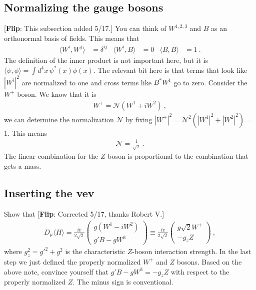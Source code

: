 \documentclass[12pt]{article}
\numberwithin{equation}{section}    %
\newcommand{\flip}[1]{{\color{red} [\textbf{Flip}: {#1}]}}
\begin{document}
\subsection*{Normalizing the gauge bosons}
\flip{This subsection added 5/17.}
You can think of $W^{1,2,3}$ and $B$ as an orthonormal basis of fields. This means that
\begin{align}
	\langle W^i, W^j\rangle &= \delta^{ij}
	&
	\langle W^i, B\rangle &= 0
	&
	\langle B, B\rangle &= 1 \ .
\end{align}
The definition of the inner product is not important here, but it is $\langle \psi, \phi\rangle = \int d^4x\, \psi^*(x)\phi(x)$. The relevant bit here is that terms that look like $|W^i|^2$ are normalized to one and cross terms like $B^*W^1$ go to zero. Consider the $W^+$ boson. We know that it is 
\begin{align}
	W^+ = \mathcal N \left(W^1 + i W^2\right) \ ,
\end{align}
we can determine the normalization $\mathcal N$ by fixing $|W^+|^2 = \mathcal N^2 \left(|W^1|^2 + |W^2|^2\right)$ = 1. This means
\begin{align}
	\mathcal N = \frac{1}{\sqrt{2}} \ .
\end{align}
The linear combination for the $Z$ boson is proportional to the combination that gets a mass.



\subsection{Inserting the vev}

Show that \flip{Corrected 5/17, thanks Robert V.}
\begin{align}
	D_\mu \langle H \rangle = \frac{i v}{2\sqrt{2}}
	\begin{pmatrix}
		g\left(W^1 - i W^2\right) \\
		g'B - g W^3
	\end{pmatrix}
	\equiv 
	\frac{i v}{2\sqrt{2}}
	\begin{pmatrix}
		g\sqrt{2}W^+ \\
		-g_z Z
	\end{pmatrix} \ ,
\end{align}
where $g_z^2 = g'^2 + g^2$ is the characteristic $Z$-boson interaction strength. In the last step we just defined the properly normalized $W^+$ and $Z$ bosons. Based on the above note, convince yourself that $g'B-gW^3 = -g_z Z$ with respect to the properly normalized $Z$. The minus sign is conventional. 
\end{document}

